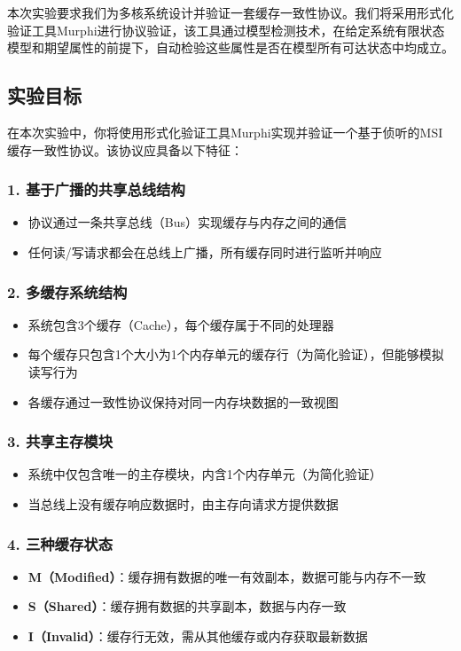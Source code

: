 \documentclass[a4paper]{article}
\begin{document}
本次实验要求我们为多核系统设计并验证一套缓存一致性协议。我们将采用形式化验证工具Murphi进行协议验证，该工具通过模型检测技术，在给定系统有限状态模型和期望属性的前提下，自动检验这些属性是否在模型所有可达状态中均成立。

\subsection{实验目标}

在本次实验中，你将使用形式化验证工具Murphi实现并验证一个基于侦听的MSI缓存一致性协议。该协议应具备以下特征：

\subsubsection{1. 基于广播的共享总线结构}
\begin{itemize}
    \item 协议通过一条共享总线（Bus）实现缓存与内存之间的通信
    \item 任何读/写请求都会在总线上广播，所有缓存同时进行监听并响应
\end{itemize}

\subsubsection{2. 多缓存系统结构}
\begin{itemize}
    \item 系统包含3个缓存（Cache），每个缓存属于不同的处理器
    \item 每个缓存只包含1个大小为1个内存单元的缓存行（为简化验证），但能够模拟读写行为
    \item 各缓存通过一致性协议保持对同一内存块数据的一致视图
\end{itemize}

\subsubsection{3. 共享主存模块}
\begin{itemize}
    \item 系统中仅包含唯一的主存模块，内含1个内存单元（为简化验证）
    \item 当总线上没有缓存响应数据时，由主存向请求方提供数据
\end{itemize}

\subsubsection{4. 三种缓存状态}
\begin{itemize}
    \item \textbf{M（Modified）}：缓存拥有数据的唯一有效副本，数据可能与内存不一致
    \item \textbf{S（Shared）}：缓存拥有数据的共享副本，数据与内存一致
    \item \textbf{I（Invalid）}：缓存行无效，需从其他缓存或内存获取最新数据
\end{itemize}
\end{document}
